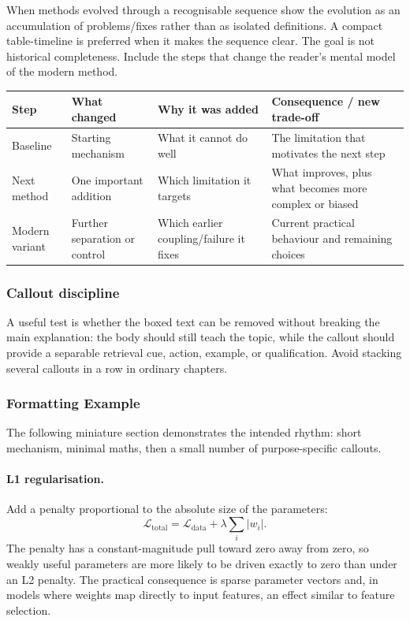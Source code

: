When methods evolved through a recognisable sequence show the evolution as an accumulation of problems/fixes rather than as isolated definitions.
A compact table-timeline is preferred when it makes the sequence clear.
The goal is not historical completeness. 
Include the steps that change the reader's mental model of the modern method.

\begin{center}
\small
\begin{tabularx}{0.96\textwidth}{@{}L{0.17\textwidth}L{0.22\textwidth}Y Y@{}}
\toprule
\textbf{Step} & \textbf{What changed} & \textbf{Why it was added} & \textbf{Consequence / new trade-off} \\
\midrule
Baseline & Starting mechanism & What it cannot do well & The limitation that motivates the next step \\
Next method & One important addition & Which limitation it targets & What improves, plus what becomes more complex or biased \\
Modern variant & Further separation or control & Which earlier coupling/failure it fixes & Current practical behaviour and remaining choices \\
\bottomrule
\end{tabularx}
\end{center}

\subsubsection*{Callout discipline}

A useful test is whether the boxed text can be removed without breaking the main explanation: the body should still teach the topic, while the callout should provide a separable retrieval cue, action, example, or qualification.
Avoid stacking several callouts in a row in ordinary chapters.

\subsubsection*{Formatting Example}

The following miniature section demonstrates the intended rhythm: short mechanism, minimal maths, then a small number of purpose-specific callouts.

\paragraph{L1 regularisation.}
Add a penalty proportional to the absolute size of the parameters:
\[
\mathcal{L}_{\text{total}}
=
\mathcal{L}_{\text{data}}
+
\lambda\sum_i |w_i|.
\]
The penalty has a constant-magnitude pull toward zero away from zero, so weakly useful parameters are more likely to be driven exactly to zero than under an L2 penalty. The practical consequence is sparse parameter vectors and, in models where weights map directly to input features, an effect similar to feature selection.

